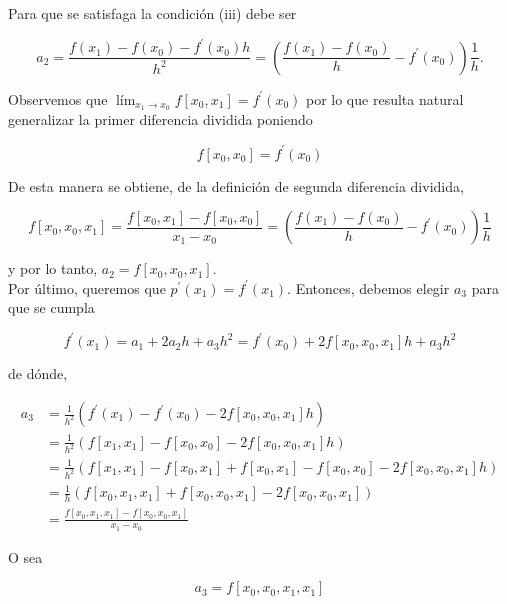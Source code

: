 \documentclass[10pt]{article}
\begin{document}
Para que se satisfaga la condición (iii) debe ser

$$
a_{2}=\frac{f\left(x_{1}\right)-f\left(x_{0}\right)-f^{\prime}\left(x_{0}\right) h}{h^{2}}=\left(\frac{f\left(x_{1}\right)-f\left(x_{0}\right)}{h}-f^{\prime}\left(x_{0}\right)\right) \frac{1}{h} .
$$

Observemos que $\operatorname{lím}_{x_{1} \rightarrow x_{0}} f\left[x_{0}, x_{1}\right]=f^{\prime}\left(x_{0}\right)$ por lo que resulta natural generalizar la primer diferencia dividida poniendo

$$
f\left[x_{0}, x_{0}\right]=f^{\prime}\left(x_{0}\right)
$$

De esta manera se obtiene, de la definición de segunda diferencia dividida,

$$
f\left[x_{0}, x_{0}, x_{1}\right]=\frac{f\left[x_{0}, x_{1}\right]-f\left[x_{0}, x_{0}\right]}{x_{1}-x_{0}}=\left(\frac{f\left(x_{1}\right)-f\left(x_{0}\right)}{h}-f^{\prime}\left(x_{0}\right)\right) \frac{1}{h}
$$

y por lo tanto, $a_{2}=f\left[x_{0}, x_{0}, x_{1}\right]$.\\
Por último, queremos que $p^{\prime}\left(x_{1}\right)=f^{\prime}\left(x_{1}\right)$. Entonces, debemos elegir $a_{3}$ para que se cumpla

$$
f^{\prime}\left(x_{1}\right)=a_{1}+2 a_{2} h+a_{3} h^{2}=f^{\prime}\left(x_{0}\right)+2 f\left[x_{0}, x_{0}, x_{1}\right] h+a_{3} h^{2}
$$

de dónde,

$$
\begin{aligned}
a_{3} & =\frac{1}{h^{2}}\left(f^{\prime}\left(x_{1}\right)-f^{\prime}\left(x_{0}\right)-2 f\left[x_{0}, x_{0}, x_{1}\right] h\right) \\
& =\frac{1}{h^{2}}\left(f\left[x_{1}, x_{1}\right]-f\left[x_{0}, x_{0}\right]-2 f\left[x_{0}, x_{0}, x_{1}\right] h\right) \\
& =\frac{1}{h^{2}}\left(f\left[x_{1}, x_{1}\right]-f\left[x_{0}, x_{1}\right]+f\left[x_{0}, x_{1}\right]-f\left[x_{0}, x_{0}\right]-2 f\left[x_{0}, x_{0}, x_{1}\right] h\right) \\
& =\frac{1}{h}\left(f\left[x_{0}, x_{1}, x_{1}\right]+f\left[x_{0}, x_{0}, x_{1}\right]-2 f\left[x_{0}, x_{0}, x_{1}\right]\right) \\
& =\frac{f\left[x_{0}, x_{1}, x_{1}\right]-f\left[x_{0}, x_{0}, x_{1}\right]}{x_{1}-x_{0}}
\end{aligned}
$$

O sea

$$
a_{3}=f\left[x_{0}, x_{0}, x_{1}, x_{1}\right]
$$
\end{document}
